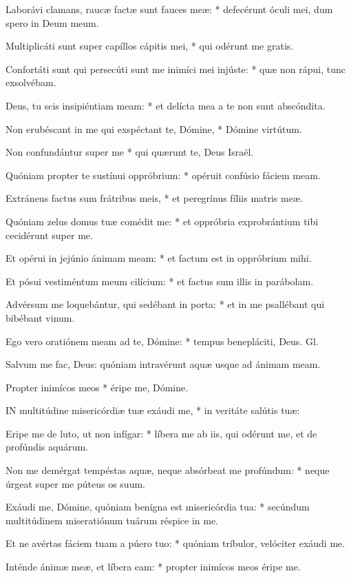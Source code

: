 Laborávi clamans, raucæ factæ sunt fauces meæ: * defecérunt óculi mei, dum spero in Deum meum.

Multiplicáti sunt super capíllos cápitis mei, * qui odérunt me gratis.

Confortáti sunt qui persecúti sunt me inimíci mei injúste: * quæ non rápui, tunc exsolvébam.

Deus, tu scis insipiéntiam meam: * et delícta mea a te non sunt abscóndita.

Non erubéscant in me qui exspéctant te, Dómine, * Dómine virtútum.

Non confundántur super me * qui quærunt te, Deus Israël.

Quóniam propter te sustínui oppróbrium: * opéruit confúsio fáciem meam.

Extráneus factus sum frátribus meis, * et peregrínus fíliis matris meæ.

Quóniam zelus domus tuæ comédit me: * et oppróbria exprobrántium tibi cecidérunt super me.

Et opérui in jejúnio ánimam meam: * et factum est in oppróbrium mihi.

Et pósui vestiméntum meum cilícium: * et factus sum illis in parábolam.

Advérsum me loquebántur, qui sedébant in porta: * et in me psallébant qui bibébant vinum.

Ego vero oratiónem meam ad te, Dómine: * tempus benepláciti, Deus. Gl.

 Salvum me fac, Deus: quóniam intravérunt aquæ usque ad ánimam meam.

 Propter inimícos meos * éripe me, Dómine.


\lettrine[lines=2]{I}{N} multitúdine misericórdiæ tuæ exáudi me, * in veritáte salútis tuæ:

Eripe me de luto, ut non infígar: * líbera me ab iis, qui odérunt me, et de profúndis aquárum.

Non me demérgat tempéstas aquæ, neque absórbeat me profúndum: * neque úrgeat super me púteus os suum.

Exáudi me, Dómine, quóniam benígna est misericórdia tua: * secúndum multitúdinem miseratiónum tuárum réspice in me.

Et ne avértas fáciem tuam a púero tuo: * quóniam tríbulor, velóciter exáudi me.

Inténde ánimæ meæ, et líbera eam: * propter inimícos meos éripe me.

